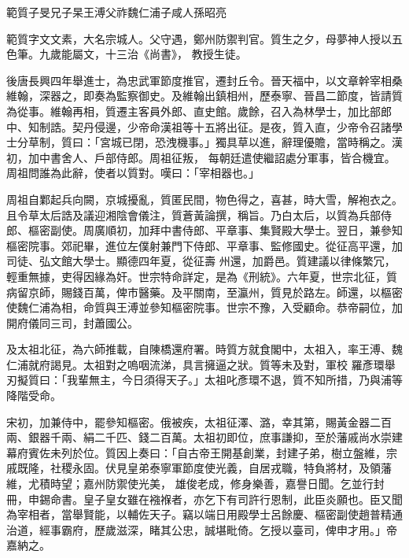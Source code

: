 
\begin{pinyinscope}

 範質子旻兄子杲王溥父祚魏仁浦子咸人孫昭亮



 範質字文文素，大名宗城人。父守遇，鄭州防禦判官。質生之夕，母夢神人授以五色筆。九歲能屬文，十三治《尚書》，
 教授生徒。



 後唐長興四年舉進士，為忠武軍節度推官，遷封丘令。晉天福中，以文章幹宰相桑維翰，深器之，即奏為監察御史。及維翰出鎮相州，歷泰寧、晉昌二節度，皆請質為從事。維翰再相，質遷主客員外郎、直史館。歲餘，召入為林學士，加比部郎中、知制誥。契丹侵邊，少帝命漢祖等十五將出征。是夜，質入直，少帝令召諸學士分草制，質曰：「宮城已閉，恐洩機事。」獨具草以進，辭理優贍，當時稱之。漢初，加中書舍人、戶部侍郎。周祖征叛，
 每朝廷遣使繼詔處分軍事，皆合機宜。周祖問誰為此辭，使者以質對。嘆曰：「宰相器也。」



 周祖自鄴起兵向闕，京城擾亂，質匿民間，物色得之，喜甚，時大雪，解袍衣之。且令草太后誥及議迎湘陰會儀注，質蒼黃論撰，稱旨。乃白太后，以質為兵部侍郎、樞密副使。周廣順初，加拜中書侍郎、平章事、集賢殿大學士。翌日，兼參知樞密院事。郊祀畢，進位左僕射兼門下侍郎、平章事、監修國史。從征高平還，加司徒、弘文館大學士。顯德四年夏，從征壽
 州還，加爵邑。質建議以律條繁冗，輕重無據，吏得因緣為奸。世宗特命詳定，是為《刑統》。六年夏，世宗北征，質病留京師，賜錢百萬，俾市醫藥。及平關南，至瀛州，質見於路左。師還，以樞密使魏仁浦為相，命質與王溥並參知樞密院事。世宗不豫，入受顧命。恭帝嗣位，加開府儀同三司，封蕭國公。



 及太祖北征，為六師推載，自陳橋還府署。時質方就食閣中，太祖入，率王溥、魏仁浦就府謁見。太祖對之嗚咽流涕，具言擁逼之狀。質等未及對，軍校
 羅彥環舉刃擬質曰：「我輩無主，今日須得天子。」太祖叱彥環不退，質不知所措，乃與浦等降階受命。



 宋初，加兼侍中，罷參知樞密。俄被疾，太祖征澤、潞，幸其第，賜黃金器二百兩、銀器千兩、絹二千匹、錢二百萬。太祖初即位，庶事謙抑，至於藩戚尚水崇建幕府賓佐未列於位。質因上奏曰：「自古帝王開基創業，封建子弟，樹立盤維，宗戚既隆，社稷永固。伏見皇弟泰寧軍節度使光義，自居戎職，特負將材，及領藩維，尤積時望；嘉州防禦使光美，
 雄俊老成，修身樂善，嘉譽日聞。乞並行封冊，申錫命書。皇子皇女雖在襁褓者，亦乞下有司許行恩制，此臣炎願也。臣又聞為宰相者，當舉賢能，以輔佐天子。竊以端日用殿學士呂餘慶、樞密副使趙普精通治道，經事霸府，歷歲滋深，睹其公忠，誠堪毗倚。乞授以臺司，俾申才用。」帝嘉納之。




\end{pinyinscope}
